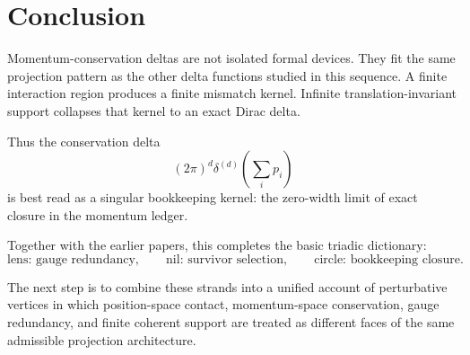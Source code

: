 \documentclass[11pt]{article}
\begin{document}
\section{Conclusion}

Momentum-conservation deltas are not isolated formal devices.  They fit the same projection pattern as the other delta functions studied in this sequence.  A finite interaction region produces a finite mismatch kernel.  Infinite translation-invariant support collapses that kernel to an exact Dirac delta.

Thus the conservation delta
\[
(2\pi)^d\delta^{(d)}\left(\sum_i p_i\right)
\]
is best read as a singular bookkeeping kernel: the zero-width limit of exact closure in the momentum ledger.

Together with the earlier papers, this completes the basic triadic dictionary:
\[
\text{lens: gauge redundancy},
\qquad
\text{nil: survivor selection},
\qquad
\text{circle: bookkeeping closure}.
\]

The next step is to combine these strands into a unified account of perturbative vertices in which position-space contact, momentum-space conservation, gauge redundancy, and finite coherent support are treated as different faces of the same admissible projection architecture.
\end{document}
